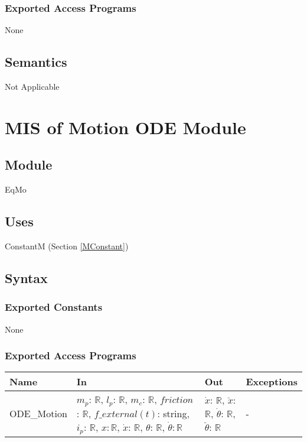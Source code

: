 \documentclass[12pt, titlepage]{article}
\begin{document}
\subsubsection{Exported Access Programs}
None
\subsection{Semantics}

Not Applicable



\newpage
\section{MIS of Motion ODE  Module  \label{MC} }


\subsection{Module}

EqMo

\subsection{Uses}

ConstantM (Section \ref{MConstant})


\subsection{Syntax}

\subsubsection{Exported Constants}
None
\subsubsection{Exported Access Programs}

\begin{center}
\begin{tabular}{p{3cm} p{6cm} p{4cm} p{3cm}}
\hline
\textbf{Name} & \textbf{In} & \textbf{Out} & \textbf{Exceptions} \\
\hline
ODE\_Motion & $ m_p$: $\mathbb{R}$, $l_p$: $\mathbb{R}$, $m_c$: $\mathbb{R}$, $friction$: $\mathbb{R}$, $f\_external(t)$: string, $i_p$: $\mathbb{R}$, $x$$: \mathbb{R}$, $\dot{x}$: $\mathbb{R}$, $\theta$: $\mathbb{R}$, $\dot{\theta}$$: \mathbb{R}$ & $\dot{x}$: $\mathbb{R}$, $\ddot{x}$: $\mathbb{R}$, $\dot{\theta}$: $\mathbb{R}$, $\ddot{\theta}$: $\mathbb{R}$  & - \\
\end{tabular}
\end{center}
\end{document}
